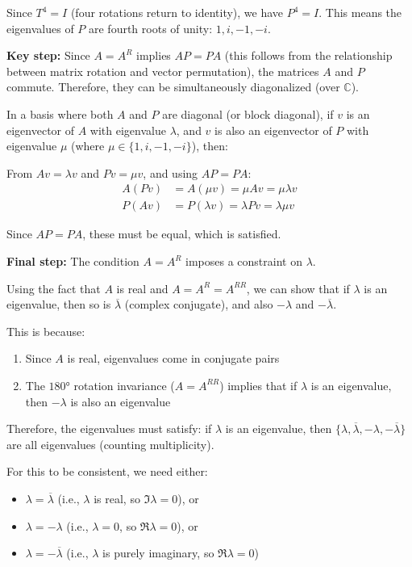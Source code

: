 \documentclass[12pt,a4paper]{article}
\theoremstyle{definition}
\begin{document}
    Since $T^4 = I$ (four rotations return to identity), we have $P^4 = I$. This means the eigenvalues of $P$ are fourth roots of unity: $1, i, -1, -i$.

    \textbf{Key step:} Since $A = A^R$ implies $AP = PA$ (this follows from the relationship between matrix rotation and vector permutation), the matrices $A$ and $P$ commute. Therefore, they can be simultaneously diagonalized (over $\mathbb{C}$).

    In a basis where both $A$ and $P$ are diagonal (or block diagonal), if $v$ is an eigenvector of $A$ with eigenvalue $\lambda$, and $v$ is also an eigenvector of $P$ with eigenvalue $\mu$ (where $\mu \in \{1, i, -1, -i\}$), then:

    From $Av = \lambda v$ and $Pv = \mu v$, and using $AP = PA$:
    \begin{align}
        A(Pv) &= A(\mu v) = \mu Av = \mu \lambda v \\
        P(Av) &= P(\lambda v) = \lambda Pv = \lambda \mu v
    \end{align}

    Since $AP = PA$, these must be equal, which is satisfied.

    \textbf{Final step:} The condition $A = A^R$ imposes a constraint on $\lambda$.

    Using the fact that $A$ is real and $A = A^R = A^{RR}$, we can show that if $\lambda$ is an eigenvalue, then so is $\overline{\lambda}$ (complex conjugate), and also $-\lambda$ and $-\overline{\lambda}$.

    This is because:
    \begin{enumerate}
        \item Since $A$ is real, eigenvalues come in conjugate pairs
        \item The $180°$ rotation invariance ($A = A^{RR}$) implies that if $\lambda$ is an eigenvalue, then $-\lambda$ is also an eigenvalue
    \end{enumerate}

    Therefore, the eigenvalues must satisfy: if $\lambda$ is an eigenvalue, then $\{\lambda, \overline{\lambda}, -\lambda, -\overline{\lambda}\}$ are all eigenvalues (counting multiplicity).

    For this to be consistent, we need either:
    \begin{itemize}
        \item $\lambda = \overline{\lambda}$ (i.e., $\lambda$ is real, so $\Im\lambda = 0$), or
        \item $\lambda = -\lambda$ (i.e., $\lambda = 0$, so $\Re\lambda = 0$), or
        \item $\lambda = -\overline{\lambda}$ (i.e., $\lambda$ is purely imaginary, so $\Re\lambda = 0$)
    \end{itemize}
\end{document}
